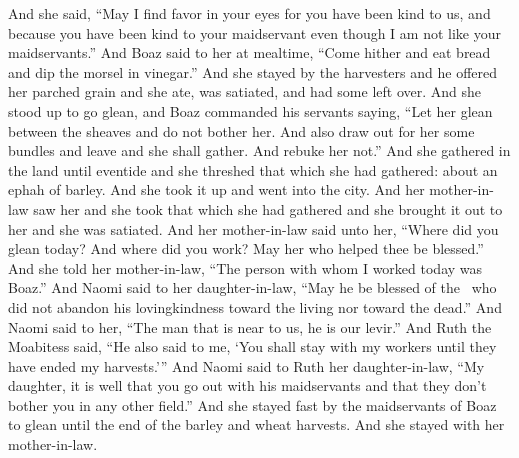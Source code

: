 \begin{inparaenum}
   And she said, ``May I find favor in your eyes for you have been kind to us, and because you have been kind to your maidservant even though I am not like your maidservants.''%
   And Boaz said to her at mealtime, ``Come hither and eat bread and dip the morsel in vinegar.'' And she stayed by the harvesters and he offered her parched grain and she ate, was satiated, and had some left over.%
   And she stood up to go glean, and Boaz commanded his servants saying, ``Let her glean between the sheaves and do not bother her.%
   And also draw out for her some bundles and leave and she shall gather. And rebuke her not.''%
   And she gathered in the land until eventide and she threshed that which she had gathered: about an ephah of barley.%
   And she took it up and went into the city. And her mother-in-law saw her and she took that which she had gathered and she brought it out to her and she was satiated.%
   And her mother-in-law said unto her, ``Where did you glean today? And where did you work? May her who helped thee be blessed.'' And she told her mother-in-law, ``The person with whom I worked today was Boaz.''%
   And Naomi said to her daughter-in-law, ``May he be blessed of the \lord\ who did not abandon his lovingkindness toward the living nor toward the dead.'' And Naomi said to her, ``The man that is near to us, he is our levir.''%
   And Ruth the Moabitess said, ``He also said to me, `You shall stay with my workers until they have ended my harvests.'''%
   And Naomi said to Ruth her daughter-in-law, ``My daughter, it is well that you go out with his maidservants and that they don't bother you in any other field.''%
   And she stayed fast by the maidservants of Boaz to glean until the end of the barley and wheat harvests. And she stayed with her mother-in-law.%
\end{inparaenum}
